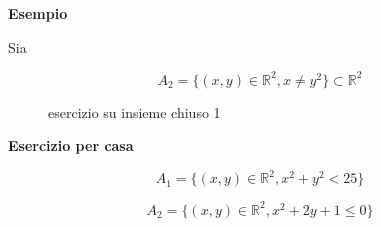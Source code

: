 \documentclass[../appunti-analisi.tex]{subfiles}
\begin{document}
\textbf{Esempio} 

Sia

\[
    A_2= \{ (x,y) \in \mathbb{R}^{2}, x \neq y^{2}\} \subset \mathbb{R}^{2}
\]

\begin{figure}[ht]
    \centering
    \caption{esercizio su insieme chiuso 1}
    \label{fig:esercizio-su-insieme-chiuso-1}
\end{figure}


\textbf{Esercizio per casa} 

\[
    A_1= \{ (x,y) \in \mathbb{R}^{2}, x^{2}+ y^{2} < 25\}
\]

\[
    A_2= \{ (x,y) \in \mathbb{R}^{2}, x^{2}+ 2y +1  \le  0\}
\]
\end{document}
